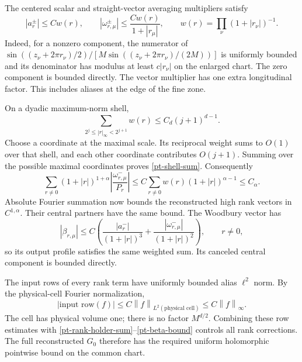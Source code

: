 \documentclass[11pt]{article}
\newcommand{\norm}[1]{\left\lVert#1\right\rVert}
\begin{document}
The centered scalar and straight-vector averaging multipliers satisfy
\begin{equation}\label{pt-alias-weights}
 |a_r^\pm|\le Cw(r),\qquad
 |\omega_{r,\mu}^\pm|\le\frac{Cw(r)}{1+|r_\mu|},\qquad
 w(r)=\prod_\nu(1+|r_\nu|)^{-1}.
\end{equation}
Indeed, for a nonzero component, the numerator of
$\sin((z_\nu+2\pi r_\nu)/2)/
 [M\sin((z_\nu+2\pi r_\nu)/(2M))]$
is uniformly bounded and its denominator has modulus at least
$c|r_\nu|$ on the enlarged chart. The zero component is bounded
directly. The vector multiplier has one extra longitudinal factor.
This includes aliases at the edge of the fine zone.

On a dyadic maximum-norm shell,
\begin{equation}\label{pt-shell-sum}
 \sum_{2^j\le|r|_\infty<2^{j+1}}w(r)
                      \le C_d(j+1)^{d-1}.
\end{equation}
Choose a coordinate at the maximal scale. Its reciprocal weight sums
to $O(1)$ over that shell, and each other coordinate contributes
$O(j+1)$. Summing over the possible maximal coordinates proves
\eqref{pt-shell-sum}. Consequently
\begin{equation}\label{pt-rank-holder-sum}
 \sum_{r\ne0}(1+|r|)^{1+\alpha}
             \left|\frac{\omega_{r,\mu}^-}{P_r}\right|
   \le C\sum_{r\ne0}w(r)(1+|r|)^{\alpha-1}
   \le C_\alpha.
\end{equation}
Absolute Fourier summation now bounds the reconstructed high rank
vectors in $C^{1,\alpha}$. Their central partners have the same bound.
The Woodbury vector has
\begin{equation}\label{pt-beta-bound}
 |\beta_{r,\mu}|
  \le C\left(\frac{|a_r^-|}{(1+|r|)^3}
                  +\frac{|\omega_{r,\mu}^-|}{(1+|r|)^2}\right),
       \qquad r\ne0,
\end{equation}
so its output profile satisfies the same weighted sum. Its canceled
central component is bounded directly.

The input rows of every rank term have uniformly bounded alias
$\ell^2$ norm. By the physical-cell Fourier normalization,
\[
 |\text{input row}(f)|
       \le C\norm{f}_{L^2(\text{physical cell})}
       \le C\norm{f}_\infty.
\]
The cell has physical volume one; there is no factor $M^{d/2}$.
Combining these row estimates with
\eqref{pt-rank-holder-sum}--\eqref{pt-beta-bound} controls all rank
corrections. The full reconstructed $G_0$ therefore has the required
uniform holomorphic pointwise bound on the common chart.
\end{document}
